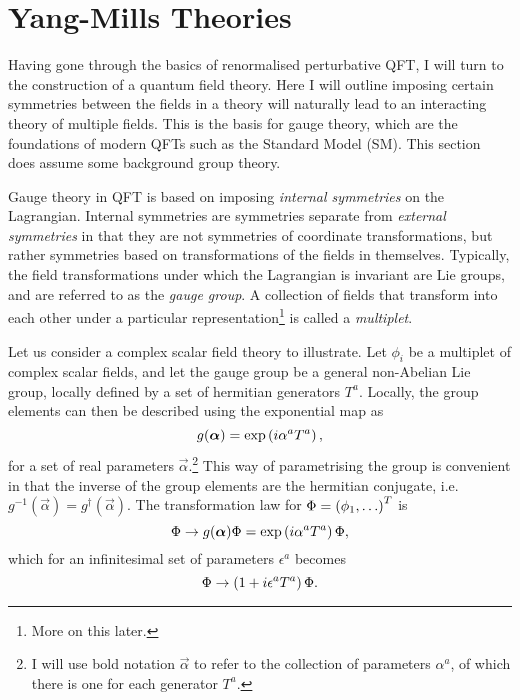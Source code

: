 \documentclass[../main.tex]{subfiles}
\begin{document}
\section{Yang-Mills Theories}
\label{qft:sec:yang-mills}
Having gone through the basics of renormalised perturbative QFT, I will turn to the construction of a quantum field theory.
Here I will outline imposing certain symmetries between the fields in a theory will naturally lead to an interacting theory of multiple fields.
This is the basis for gauge theory, which are the foundations of modern QFTs such as the Standard Model (SM).
This section does assume some background group theory.
\medskip

Gauge theory in QFT is based on imposing \emph{internal symmetries} on the Lagrangian.
Internal symmetries are symmetries separate from \emph{external symmetries} in that they are not symmetries of coordinate transformations, but rather symmetries based on transformations of the fields in themselves.
Typically, the field transformations under which the Lagrangian is invariant are Lie groups, and are referred to as the \emph{gauge group}.
A collection of fields that transform into each other under a particular representation\footnote{More on this later.} is called a \emph{multiplet}.

Let us consider a complex scalar field theory to illustrate.
Let \(\phi_i\) be a multiplet of complex scalar fields, and let the gauge group be a general non-Abelian Lie group, locally defined by a set of hermitian generators \(T^a\).
Locally, the group elements can then be described using the exponential map as\needcite\
\begin{equation}
  \label{qft:eq:exponential_map}
  g(\boldsymbol{\alpha}) = \operatorname{exp}\left(i \alpha^a T^a\right),
\end{equation}
for a set of real parameters \(\vec{\alpha}\).\footnote{I will use bold
  notation \(\vec\alpha\) to refer to the collection of parameters
  \(\alpha^a\), of which there is one for each generator \(T^a\).}
This way of parametrising the group is convenient in that the inverse of the group elements are the hermitian conjugate, i.e.\ \(g^{-1}(\vec\alpha) = g^\dagger(\vec{\alpha})\).
The transformation law for \(\Phi = \left(\phi_1, \ldots\right)^T\) is
\begin{equation}
  \label{qft:eq:gauge_transformation}
  \Phi \to g(\boldsymbol{\alpha}) \Phi = \operatorname{exp}\left(i \alpha^a T^a\right) \Phi,
\end{equation}
which for an infinitesimal set of parameters \(\epsilon^a\) becomes
\begin{equation}
  \Phi \to \left(1 + i \epsilon^a T^a\right) \Phi.
\end{equation}
\medskip
\end{document}
